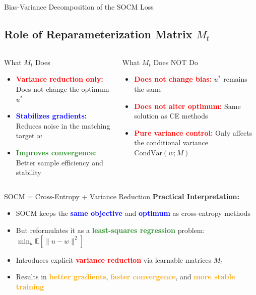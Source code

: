 \documentclass[aspectratio=169,xcolor=dvipsnames]{beamer}
\begin{document}
\begin{frame}[allowframebreaks]{Bias-Variance Decomposition of the SOCM Loss}
    \vspace{-0.5cm}
    \subsection*{Role of Reparameterization Matrix $M_t$}
    
    \begin{columns}[t]
        \begin{block}{What $M_t$ Does}
            \begin{itemize}
                \item \textcolor{red}{\textbf{Variance reduction only:}} Does not change the optimum $u^*$
                \item \textcolor{blue}{\textbf{Stabilizes gradients:}} Reduces noise in the matching target $w$
                \item \textcolor{ForestGreen}{\textbf{Improves convergence:}} Better sample efficiency and stability
            \end{itemize}
        \end{block}
        
        \begin{alertblock}{What $M_t$ Does NOT Do}
            \begin{itemize}
                \item \textcolor{red}{\textbf{Does not change bias:}} $u^*$ remains the same
                \item \textcolor{red}{\textbf{Does not alter optimum:}} Same solution as CE methods
                \item \textcolor{red}{\textbf{Pure variance control:}} Only affects the conditional variance $\text{CondVar}(w; M)$
            \end{itemize}
        \end{alertblock}
    \end{columns}
    
    \vspace{0.8cm}
    
    \begin{block}{SOCM = Cross-Entropy + Variance Reduction}
        \textbf{Practical Interpretation:}
        \begin{itemize}
            \item SOCM keeps the \textcolor{blue}{\textbf{same objective}} and \textcolor{blue}{\textbf{optimum}} as cross-entropy methods
            \item But reformulates it as a \textcolor{ForestGreen}{\textbf{least-squares regression}} problem: $\min_u \mathbb{E}[\|u - w\|^2]$
            \item Introduces explicit \textcolor{red}{\textbf{variance reduction}} via learnable matrices $M_t$
            \item Results in \textcolor{orange}{\textbf{better gradients}}, \textcolor{orange}{\textbf{faster convergence}}, and \textcolor{orange}{\textbf{more stable training}}
        \end{itemize}
    \end{block}
    

\end{frame}
\end{document}
